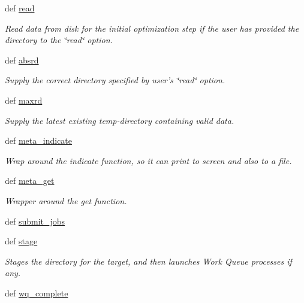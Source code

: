 \begin{DoxyCompactItemize}
def \hyperlink{classforcebalance_1_1target_1_1Target_afb87b4d33b88bb381c74b76752c5892a}{read}
\begin{DoxyCompactList}\small\item\em Read data from disk for the initial optimization step if the user has provided the directory to the \char`\"{}read\char`\"{} option. \end{DoxyCompactList}\item 
def \hyperlink{classforcebalance_1_1target_1_1Target_abb0a6089d8deaead8f78186cc8e4cbe4}{absrd}
\begin{DoxyCompactList}\small\item\em Supply the correct directory specified by user's \char`\"{}read\char`\"{} option. \end{DoxyCompactList}\item 
def \hyperlink{classforcebalance_1_1target_1_1Target_a961ce7e772836b1465cb44e3f03145df}{maxrd}
\begin{DoxyCompactList}\small\item\em Supply the latest existing temp-\/directory containing valid data. \end{DoxyCompactList}\item 
def \hyperlink{classforcebalance_1_1target_1_1Target_a99c84ef8ea504d7699c927e261f648e4}{meta\-\_\-indicate}
\begin{DoxyCompactList}\small\item\em Wrap around the indicate function, so it can print to screen and also to a file. \end{DoxyCompactList}\item 
def \hyperlink{classforcebalance_1_1target_1_1Target_a17c8ac0c7dd0a0430accddfd12602103}{meta\-\_\-get}
\begin{DoxyCompactList}\small\item\em Wrapper around the get function. \end{DoxyCompactList}\item 
def \hyperlink{classforcebalance_1_1target_1_1Target_a78cd29b94cbcc201eed99c78aaef46a4}{submit\-\_\-jobs}
\item 
def \hyperlink{classforcebalance_1_1target_1_1Target_af8d2a4658c87841e40296795aec478bb}{stage}
\begin{DoxyCompactList}\small\item\em Stages the directory for the target, and then launches Work Queue processes if any. \end{DoxyCompactList}\item 
def \hyperlink{classforcebalance_1_1target_1_1Target_af6099ec09486213869dba2491bd8ea04}{wq\-\_\-complete}

\end{DoxyCompactItemize}
